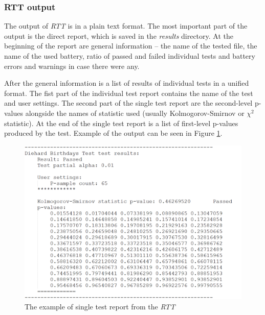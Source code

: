 \documentclass[
  digital,     %
  oneside,     %
  nosansbold,  %
  nocolorbold, %
  nolof,         %
  nolot,         %
]{fithesis4}
\begin{document}
\subsubsection{RTT output}
The output of \emph{RTT} is in a plain text format. The most important part of the output is the direct report, which is saved in the \emph{results} directory. At the beginning of the report are general information -- the name of the tested file, the name of the used battery, ratio of passed and failed individual tests and battery errors and warnings in case there were any.

After the general information is a list of results of individual tests in a unified format. The fist part of the individual test report contains the name of the test and user settings. The second part of the single test report are the second-level p-values alongside the names of statistic used (usually Kolmogorov-Smirnov or $\chi^2$ statistic). At the end of the single test report is a list of first-level p-values produced by the test. Example of the output can be seen in Figure \ref{fig:rtt_output_example}.

\begin{figure}
  \begin{center}
    \includegraphics[width=12cm]{figures/rtt_dieharder_output.png}
  \end{center}
  \caption{The example of single test report from the \emph{RTT}}
  \label{fig:rtt_output_example}
\end{figure}

\end{document}
